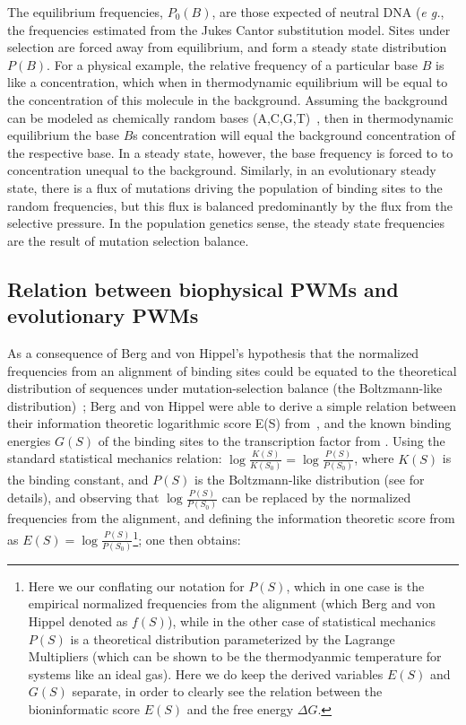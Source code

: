 The equilibrium frequencies, $P_0(B)$, are those expected of neutral DNA (\textit{e g.}, the frequencies estimated from the Jukes Cantor substitution model.  Sites under selection are forced away from equilibrium, and form a steady state distribution $P(B)$.  For a physical example, the relative frequency of a particular base $B$ is like a concentration, which when in thermodynamic equilibrium will be equal to the concentration of this molecule in the background.  Assuming the background can be modeled as chemically random bases (A,C,G,T)~\cite{345660479}, then in thermodynamic equilibrium the base $B$s concentration will equal the background concentration of the respective base.  In a steady state, however, the base frequency is forced to to concentration unequal to the background.  Similarly, in an evolutionary steady state, there is a flux of mutations driving the population of binding sites to the random frequencies, but this flux is balanced predominantly by the flux from the selective pressure.  In the population genetics sense, the steady state frequencies are the result of mutation selection balance. 

 \subsection{Relation between biophysical PWMs and evolutionary PWMs  }
As a consequence of Berg and von Hippel's hypothesis that the normalized frequencies from an alignment of binding sites could be equated to the theoretical distribution of sequences under mutation-selection balance (the Boltzmann-like distribution)~\cite{pmid3612791}; Berg and von Hippel were able to derive a simple relation between their information theoretic logarithmic score E(S) from~, and the known binding energies $G(S)$ of the binding sites to the transcription factor from . Using the standard statistical mechanics relation: $\log{\frac{K(S)}{K(S_0)}}=\log{\frac{P(S)}{P(S_0)}}$, where $K(S)$ is the binding constant, and $P(S)$ is the Boltzmann-like distribution (see  for details), and observing that $\log{\frac{P(S)}{P(S_0)}}$ can be replaced by the normalized frequencies from the alignment, and defining the information theoretic score from  as $E(S)=\log{\frac{P(S)}{P(S_0)}}$\footnote{Here we our conflating our notation for $P(S)$, which in one case is the empirical normalized frequencies from the alignment (which Berg and von Hippel denoted as $f(S)$), while in the other case of statistical mechanics $P(S)$ is a theoretical distribution parameterized by the Lagrange Multipliers (which can be shown to be the thermodyanmic temperature for systems like an ideal gas\cite{Atkins}).  Here we do keep the derived variables $E(S)$ and $G(S)$ separate, in order to clearly see the relation between the bioninformatic score $E(S)$ and the free energy $\Delta G$.}; one then obtains:   

